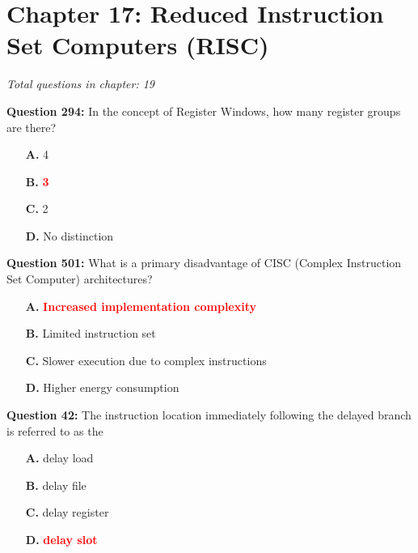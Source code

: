 \documentclass[12pt,a4paper]{article}
\begin{document}
\section{Chapter 17: Reduced Instruction Set Computers (RISC)}
\textit{Total questions in chapter: 19}

\textbf{Question 294:} In the concept of Register Windows, how many register groups are there?

\begin{itemize}
    \item[\textbf{A.}] 4
    \item[\textbf{B.}] \textcolor{red}{\textbf{3}}
    \item[\textbf{C.}] 2
    \item[\textbf{D.}] No distinction
\end{itemize}

\vspace{0.5cm}

\vspace{0.5cm}

\textbf{Question 501:} What is a primary disadvantage of CISC (Complex Instruction Set Computer) architectures?

\begin{itemize}
    \item[\textbf{A.}] \textcolor{red}{\textbf{Increased implementation complexity}}
    \item[\textbf{B.}] Limited instruction set
    \item[\textbf{C.}] Slower execution due to complex instructions
    \item[\textbf{D.}] Higher energy consumption
\end{itemize}

\vspace{0.5cm}

\vspace{0.5cm}

\textbf{Question 42:} The instruction location immediately following the delayed branch is referred to as the \underline{\hspace{1.5cm}}

\begin{itemize}
    \item[\textbf{A.}] delay load
    \item[\textbf{B.}] delay file
    \item[\textbf{C.}] delay register
    \item[\textbf{D.}] \textcolor{red}{\textbf{delay slot}}
\end{itemize}
\end{document}
